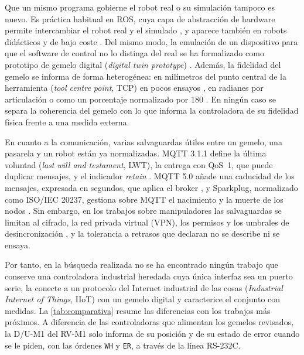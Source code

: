 Que un mismo programa gobierne el robot real o su simulación tampoco es nuevo. Es práctica habitual en ROS, cuya capa de abstracción de hardware permite intercambiar el robot real y el simulado , y aparece también en robots didácticos y de bajo coste \citep{mihali2005effective,kutzer2023scorbot,zhang2024construction}. Del mismo modo, la emulación de un dispositivo para que el software de control no lo distinga del real se ha formalizado como prototipo de gemelo digital (\textit{digital twin prototype}) . Además, la fidelidad del gemelo se informa de forma heterogénea: en milímetros del punto central de la herramienta (\textit{tool centre point}, TCP) en pocos ensayos \citep{chang2025construction,zhang2024construction}, en radianes por articulación \citep{liang2020bidirectional} o como un porcentaje normalizado por 180\textdegree{} \citep{singh2024unity}. En ningún caso se separa la coherencia del gemelo con lo que informa la controladora de su fidelidad física frente a una medida externa.

En cuanto a la comunicación, varias salvaguardas útiles entre un gemelo, una pasarela y un robot están ya normalizadas. MQTT 3.1.1 define la última voluntad (\textit{last will and testament}, LWT), la entrega con QoS~1, que puede duplicar mensajes, y el indicador \textit{retain} \citep{oasis2014mqtt}. MQTT 5.0 añade una caducidad de los mensajes, expresada en segundos, que aplica el broker \citep{oasis2019mqtt}, y Sparkplug, normalizado como ISO/IEC 20237, gestiona sobre MQTT el nacimiento y la muerte de los nodos \citep{iso2023sparkplug}.  Sin embargo, en los trabajos sobre manipuladores las salvaguardas se limitan al cifrado, la red privada virtual (VPN), los permisos y los umbrales de desincronización \citep{luu2025enhancing,bravoarrabal2025iort,liang2020bidirectional}, y la tolerancia a retrasos que declaran \citet{chang2025construction} no se describe ni se ensaya.

Por tanto, en la búsqueda realizada no se ha encontrado ningún trabajo que conserve una controladora industrial heredada cuya única interfaz sea un puerto serie, la conecte a un protocolo del Internet industrial de las cosas (\textit{Industrial Internet of Things}, IIoT) con un gemelo digital y caracterice el conjunto con medidas. La \cref{tab:comparativa} resume las diferencias con los trabajos más próximos. A diferencia de las controladoras que alimentan los gemelos revisados, la D/U-M1 del RV-M1 solo informa de su posición y de su estado de error cuando se le piden, con las órdenes \texttt{WH} y \texttt{ER}, a través de la línea RS-232C.

